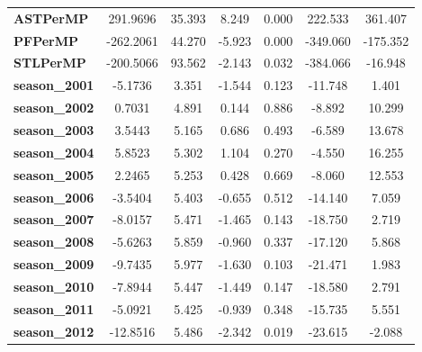 \begin{center}
\begin{tabular}{lcccccc}
\textbf{ASTPerMP}             &     291.9696  &       35.393     &     8.249  &         0.000        &      222.533    &      361.407     \\
\textbf{PFPerMP}              &    -262.2061  &       44.270     &    -5.923  &         0.000        &     -349.060    &     -175.352     \\
\textbf{STLPerMP}             &    -200.5066  &       93.562     &    -2.143  &         0.032        &     -384.066    &      -16.948     \\
\textbf{season\_2001}         &      -5.1736  &        3.351     &    -1.544  &         0.123        &      -11.748    &        1.401     \\
\textbf{season\_2002}         &       0.7031  &        4.891     &     0.144  &         0.886        &       -8.892    &       10.299     \\
\textbf{season\_2003}         &       3.5443  &        5.165     &     0.686  &         0.493        &       -6.589    &       13.678     \\
\textbf{season\_2004}         &       5.8523  &        5.302     &     1.104  &         0.270        &       -4.550    &       16.255     \\
\textbf{season\_2005}         &       2.2465  &        5.253     &     0.428  &         0.669        &       -8.060    &       12.553     \\
\textbf{season\_2006}         &      -3.5404  &        5.403     &    -0.655  &         0.512        &      -14.140    &        7.059     \\
\textbf{season\_2007}         &      -8.0157  &        5.471     &    -1.465  &         0.143        &      -18.750    &        2.719     \\
\textbf{season\_2008}         &      -5.6263  &        5.859     &    -0.960  &         0.337        &      -17.120    &        5.868     \\
\textbf{season\_2009}         &      -9.7435  &        5.977     &    -1.630  &         0.103        &      -21.471    &        1.983     \\
\textbf{season\_2010}         &      -7.8944  &        5.447     &    -1.449  &         0.147        &      -18.580    &        2.791     \\
\textbf{season\_2011}         &      -5.0921  &        5.425     &    -0.939  &         0.348        &      -15.735    &        5.551     \\
\textbf{season\_2012}         &     -12.8516  &        5.486     &    -2.342  &         0.019        &      -23.615    &       -2.088     \\

\end{tabular}
\end{center}
